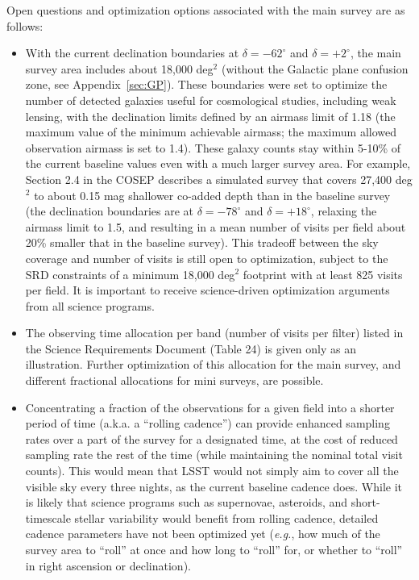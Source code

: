 \documentclass[DM,toc,usenatbib]{lsstdoc}
\begin{document}
Open questions and optimization options associated with the main survey are as follows: 
\begin{itemize}
\item With the current declination boundaries at $\delta = -62^\circ$ and $\delta = +2^\circ$,
the main survey area includes about 18,000 deg$^2$ (without the Galactic plane 
confusion zone, see Appendix~\ref{sec:GP}). These boundaries were set to optimize the number of
detected galaxies useful for cosmological studies, including weak lensing, with the declination
limits defined by an airmass limit of 1.18 (the maximum value of the minimum achievable airmass;
the maximum allowed observation airmass is set to 1.4). These galaxy counts 
stay within 5-10\% of the current baseline values even with a much larger survey area. 
For example, Section 2.4 in the COSEP describes a simulated survey
that covers 27,400 deg$^2$ to about 0.15 mag shallower co-added depth than in the baseline 
survey (the declination boundaries are at $\delta = -78^\circ$ and $\delta = +18^\circ$, relaxing the 
airmass limit to 1.5, and resulting in a mean number of visits per field about 20\% smaller that
in the baseline survey). This tradeoff between the sky coverage and number of visits is still
open to optimization, subject to the SRD constraints of a minimum 18,000 deg$^2$ footprint with at least 825 
visits per field. It is important to receive science-driven optimization arguments
from all science programs.  
\item The observing time allocation per band (number of visits per filter) listed in the Science Requirements Document
(Table 24) is given only as an illustration. Further optimization of this allocation for the main 
survey, and different fractional allocations for mini surveys, are possible. 
\item Concentrating a fraction of the observations for a given field into a shorter period of time
(a.k.a. a ``rolling cadence'') can provide enhanced
sampling rates over a part of the survey for a designated time, at the
cost of reduced sampling rate the rest of the time (while maintaining the nominal total 
visit counts). This would mean that LSST would not simply aim to cover all the visible sky every three nights,
as the current baseline cadence does. 
While it is likely that science programs such as supernovae, asteroids, and
short-timescale stellar variability would benefit from rolling cadence, detailed cadence
parameters have not been optimized yet ({\it e.g.}, how much of the survey area to ``roll'' at once 
and how long to ``roll'' for, or whether to ``roll'' in right ascension or declination).

\end{itemize}
\end{document}
